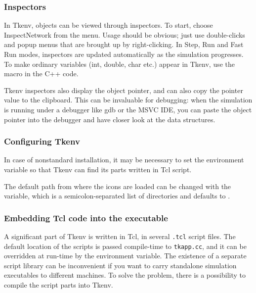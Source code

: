 \subsubsection{Inspectors}


In Tkenv, objects can be viewed through inspectors. To start, choose
Inspect{\textbar}Network from the menu. Usage should be obvious; just
use double-clicks and popup menus that are brought up by
right-clicking. In Step, Run and Fast Run modes, inspectors are
updated automatically as the simulation progresses. To make ordinary
variables (int, double, char etc.) appear in Tkenv, use the
 macro in the C++ code.

Tkenv inspectors also display the object pointer, and can also copy
the pointer value to the clipboard. This can be invaluable for debugging:
when the simulation is running under a debugger like gdb or the MSVC IDE,
you can paste the object pointer into the debugger and have closer look
at the data structures.


\subsubsection{Configuring Tkenv}


In case of nonstandard installation, it may be necessary to set the
 environment variable so that Tkenv can find
its parts written in Tcl script.

\begin{sloppypar}
The default path from where the icons are loaded can be changed with
the  variable, which is a
semicolon-separated list of directories and defaults to
.
\end{sloppypar}

\subsubsection{Embedding Tcl code into the executable}

A significant part of Tkenv is written in Tcl, in several
\texttt{.tcl} script files. The default location of the scripts is
passed compile-time to \texttt{tkapp.cc}, and it can be overridden at
run-time by the  environment variable. The
existence of a separate script library can be inconvenient if you want
to carry standalone simulation executables to different machines. To
solve the problem, there is a possibility to compile the script parts
into Tkenv.


